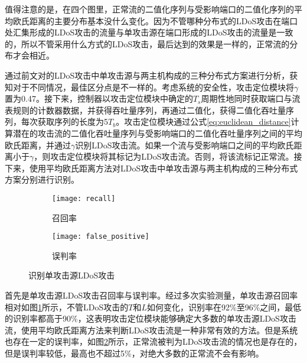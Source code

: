 值得注意的是，在四个图里，正常流的二值化序列与受影响端口的二值化序列的平均欧氏距离的主要分布基本没什么变化。因为不管哪种分布式的LDoS攻击在端口处汇集形成的LDoS攻击的流量与单攻击源在端口形成的LDoS攻击的流量是一致的，所以不管采用什么方式的LDoS攻击，最后达到的效果是一样的，正常流的分布才会相近。

通过前文对的LDoS攻击中单攻击源与两主机构成的三种分布式方案进行分析，获知对于不同情况，最佳区分点是不一样的。考虑系统的安全性，攻击定位模块将$\gamma$置为0.47。接下来，控制器以攻击定位模块中确定的$T_s$周期性地同时获取端口与流表规则的计数器数据，并获得吞吐量序列，再通过二值化，获得二值化吞吐量序列，每次获取序列的长度为5$T_b$。攻击定位模块通过公式\ref{eq:euclidean_distance}计算潜在的攻击流的二值化吞吐量序列与受影响端口的二值化吞吐量序列之间的平均欧氏距离，并通过$\gamma$识别LDoS攻击流。如果一个流与受影响端口之间的平均欧氏距离小于$\gamma$，则攻击定位模块将其标记为LDoS攻击流。否则，将该流标记正常流。接下来，使用平均欧氏距离方法对LDoS攻击中单攻击源与两主机构成的三种分布式方案分别进行识别。


\begin{figure}
    \begin{subfigure}{.49\textwidth}
        \centering
        \texttt{[image: recall]}
        \caption{召回率}
        \label{fig:recall}
    \end{subfigure}
    \begin{subfigure}{.49\textwidth}
        \centering
        \texttt{[image: false\_positive]}
        \caption{误判率}
        \label{fig:false-positive}
    \end{subfigure}
    \caption{识别单攻击源LDoS攻击}
    \label{fig:accuracy-single}
\end{figure}

首先是单攻击源LDoS攻击召回率与误判率。经过多次实验测量，单攻击源召回率相对如图\ref{fig:recall}所示，不管LDoS攻击的$T$和$L$如何变化，识别率在92\%至96\%之间，最低的识别率都高于90\%，这表明攻击定位模块能够确定大多数的单攻击源LDoS攻击流，使用平均欧氏距离方法来判断LDoS攻击流是一种非常有效的方法。但是系统也存在一定的误判率，如图\ref{fig:false-positive}所示，正常流被判为LDoS攻击流的情况也是存在的，但是误判率较低，最高也不超过5\%，对绝大多数的正常流不会有影响。



